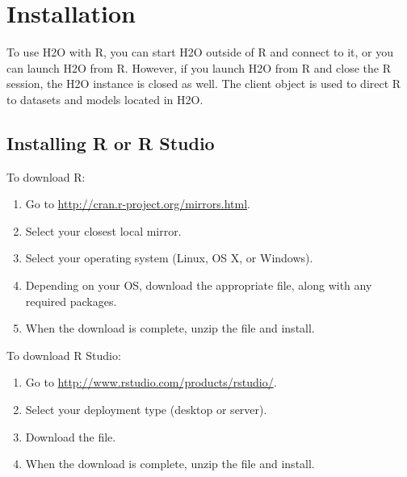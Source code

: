 \documentclass{article}[11pt]
\begin{document}
\section{Installation}

To use H2O with R, you can start H2O outside of R and connect to it, or you can launch H2O from R. However, if you launch H2O from R and close the R session, the H2O instance is closed as well. The client object is used to direct R to datasets and models located in H2O.

\subsection{Installing R or R Studio}

To download R:
\begin{enumerate}
\item Go to {\url{http://cran.r-project.org/mirrors.html}}. 
\item Select your closest local mirror. 
\item Select your operating system (Linux, OS X, or Windows). 
\item Depending on your OS, download the appropriate file, along with any required packages. 
\item When the download is complete, unzip the file and install. \\
\end{enumerate}

To download R Studio: 

\begin{enumerate}
\item Go to {\url{http://www.rstudio.com/products/rstudio/}}. 
\item Select your deployment type (desktop or server). 
\item Download the file. 
\item When the download is complete, unzip the file and install.
\end{enumerate}
\end{document}
